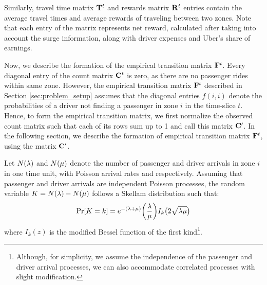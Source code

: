 Similarly, travel time matrix ${\mathbf{T}}^t$ and rewards matrix ${\mathbf{R}}^t$ entries contain the average travel times and average rewards of traveling between two zones. Note that each entry of the {\rewardsmatrix} matrix represents net reward, calculated after taking into account the surge information, along with driver expenses and Uber's share of earnings.



Now, we describe the formation of the empirical transition matrix ${\mathbf{F}}^t$. Every diagonal entry of the count matrix ${\mathbf{C}}^t$ is zero, as there are no passenger rides within same zone. However, the empirical transition matrix ${\mathbf{F}}^t$ described in Section \ref{sec:problem_setup} assumes that the diagonal entries $f(i,i)$ denote the probabilities of a driver not finding a passenger in zone $i$ in the time-slice $t$. Hence, to form the empirical transition matrix, we first normalize the observed count matrix such that each of its rows sum up to 1 and call this matrix ${\mathbf{C}}^\prime$. 
In the following section, we describe the formation of empirical transition matrix ${\mathbf{F}}^t$, using the matrix ${\mathbf{C}}^\prime$.

Let $N(\lambda)$ and $N(\mu)$ denote the number of passenger and driver arrivals in zone $i$ in one time unit, with Poisson arrival rates {\passengerarrivalrate} and {\driverarrivalrate} respectively. Assuming that passenger and driver arrivals are independent Poisson processes, the random variable $K = N(\lambda) - N(\mu)$ follows a Skellam distribution 
such that:
\begin{equation}
\Pr[K=k] = e^{-(\lambda + \mu)} \bigg(\frac{\lambda}{\mu}\bigg) I_k\big(2 \sqrt{\lambda \mu}\big)
\end{equation}
where $I_k(z)$ is the modified Bessel function of the first kind\footnote{Although, for simplicity, we assume the independence of the passenger and driver arrival processes, we can also accommodate correlated processes with slight modification.}.

